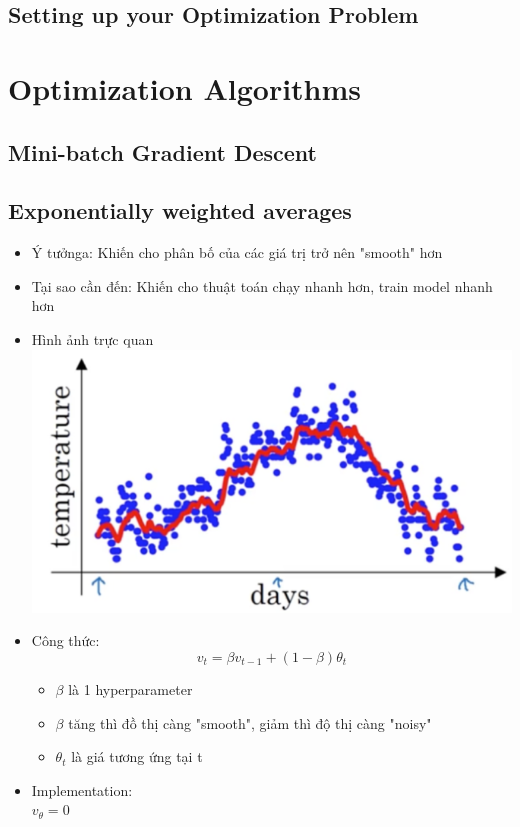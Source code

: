 \documentclass[12pt,a4paper]{report}
\begin{document}
	\section{Setting up your Optimization Problem}
\chapter{Optimization Algorithms}
	\section{Mini-batch Gradient Descent}
	\section{Exponentially weighted averages}
		\begin{itemize}
			\item Ý tưởnga: Khiến cho phân bố của các giá trị trở nên "smooth" hơn
			\item Tại sao cần đến: Khiến cho thuật toán chạy nhanh hơn, train model nhanh hơn
			\item Hình ảnh trực quan \\\includegraphics[scale=0.5]{1}
			\item Công thức:
				\[ v_t = \beta v_{t-1} + (1 - \beta)\theta_t \]
				\begin{itemize}
					\item $ \beta $ là 1 hyperparameter
					\item $ \beta $ tăng thì đồ thị càng "smooth", giảm thì độ thị càng "noisy"
					\item $ \theta_t $ là giá tương ứng tại t
				\end{itemize}
			\item Implementation: \\
				$v_\theta = 0$ \\

\end{itemize}
\end{document}
